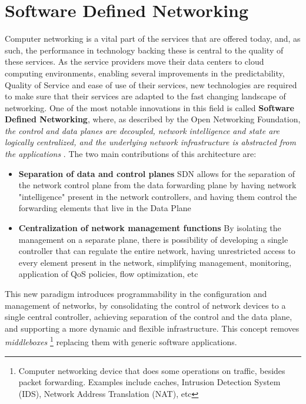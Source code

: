 \section{Software Defined Networking} \label{chap:sdn}

Computer networking is a vital part of the services that are offered today, and, as such, the performance in technology backing these is central to the
quality of these services. As the service providers move their data centers to cloud computing environments, enabling several improvements in the predictability,
Quality of Service and ease of use of their services, new technologies are required to make sure that their services are adapted to the fast changing landscape of 
networking. One of the most notable innovations in this field is called \textbf{Software Defined Networking}, where, as described by the Open Networking
Foundation, \textit{the control and data planes are decoupled, network intelligence and state are logically centralized, and the underlying
network infrastructure is abstracted from the applications} \cite{open_networking_foundation_sdn_2014}. 
The two main contributions of this architecture are:

\begin {itemize}
    \item \textbf{Separation of data and control planes} SDN allows for the separation of the network control plane from the data forwarding plane by having network
        "intelligence" present in the network controllers, and having them control the forwarding elements that live in the Data Plane
    \item \textbf{Centralization of network management functions} By isolating the management on a separate plane, there is possibility of developing a single
        controller that can regulate the entire network, having unrestricted access to every element present in the network, simplifying management, monitoring,
        application of QoS policies, flow optimization, etc
\end {itemize}

\par This new paradigm introduces programmability in the configuration and management of networks, by consolidating the control of network devices to a single
central controller, achieving separation of the control and the data plane, and supporting a more dynamic and flexible infrastructure. This concept removes 
\textit {middleboxes} \footnote {Computer networking device that does some operations on traffic, besides packet forwarding. Examples include caches, Intrusion 
Detection System (IDS), Network Address Translation (NAT), etc} replacing them with generic software applications.

